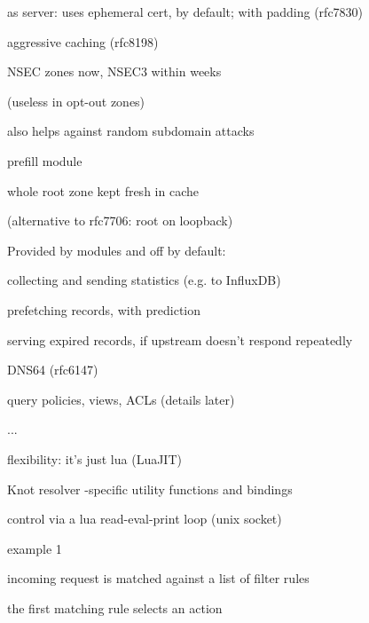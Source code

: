 	\item as server: uses ephemeral cert, by default;
		with padding (rfc7830)
	\endDashList

\endBulletList
{}
\bulletList

\item aggressive caching (rfc8198)
	\dashList
	\item NSEC zones now, NSEC3 within weeks
	\par (useless in opt-out zones)
	\item also helps against random subdomain attacks
	\endDashList

\item prefill module
	\dashList
	\item whole root zone kept fresh in cache
	\par (alternative to rfc7706: root on loopback)
	\endDashList

\endBulletList


Provided by modules and off by default:
\bulletList
\item collecting and sending statistics (e.g. to InfluxDB)
\item prefetching records, with prediction
\item serving expired records, if upstream doesn't respond repeatedly
\item DNS64 (rfc6147)
\item query policies, views, ACLs (details later)
\item ...
\endBulletList


\slide[Configuration]
\bulletList
\item flexibility: it's just lua (LuaJIT)
\item Knot resolver -specific utility functions and bindings
\item control via a lua read-eval-print loop (unix socket)
\item {\tti example 1}
\endBulletList



\bulletList
\item incoming request is matched against a list of \cznicred filter\endCol{} rules
\item the first matching rule selects an \cznicred action\endCol
\endBulletList

